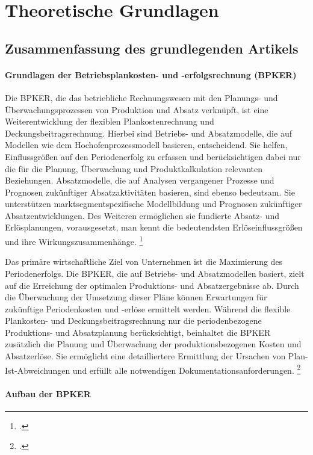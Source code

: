\chapter{Theoretische Grundlagen}

\section{Zusammenfassung des grundlegenden Artikels}

\subsubsection{Grundlagen der Betriebsplankosten- und -erfolgsrechnung (BPKER)}

Die BPKER, die das betriebliche Rechnungswesen mit den Planungs- und Überwachungsprozessen von Produktion und Absatz verknüpft, ist eine Weiterentwicklung der flexiblen Plankostenrechnung und Deckungsbeitragsrechnung. Hierbei sind Betriebs- und Absatzmodelle, die auf Modellen wie dem Hochofenprozessmodell basieren, entscheidend. Sie helfen, Einflussgrö{\ss}en auf den Periodenerfolg zu erfassen und berücksichtigen dabei nur die für die Planung, Überwachung und Produktkalkulation relevanten Beziehungen. Absatzmodelle, die auf Analysen vergangener Prozesse und Prognosen zukünftiger Absatzaktivitäten basieren, sind ebenso bedeutsam. Sie unterstützen marktsegmentspezifische Modellbildung und Prognosen zukünftiger Absatzentwicklungen. Des Weiteren ermöglichen sie fundierte Absatz- und Erlösplanungen, vorausgesetzt, man kennt die bedeutendsten Erlöseinflussgrö{\ss}en und ihre Wirkungszusammenhänge. \footcite[Vgl.][S. 295f]{Artikel_orginal}

Das primäre wirtschaftliche Ziel von Unternehmen ist die Maximierung des Periodenerfolgs. Die BPKER, die auf Betriebs- und Absatzmodellen basiert, zielt auf die Erreichung der optimalen Produktions- und Absatzergebnisse ab. Durch die Überwachung der Umsetzung dieser Pläne können Erwartungen für zukünftige Periodenkosten und -erlöse ermittelt werden. Während die flexible Plankosten- und Deckungsbeitragsrechnung nur die periodenbezogene Produktions- und Absatzplanung berücksichtigt, beinhaltet die BPKER zusätzlich die Planung und Überwachung der produktionsbezogenen Kosten und Absatzerlöse. Sie ermöglicht eine detailliertere Ermittlung der Ursachen von Plan-Ist-Abweichungen und erfüllt alle notwendigen Dokumentationsanforderungen. \footcite[Vgl.][S. 296f]{Artikel_orginal}

\subsubsection{Aufbau der BPKER}

